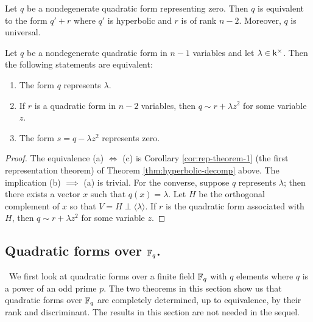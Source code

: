 \begin{theoremx}\label{thm:hyperbolic-decomp-2} Let \(q\) be a nondegenerate
    quadratic form representing zero. Then \(q\) is equivalent to the form \(q'
    + r\) where \(q'\) is hyperbolic and \(r\) is of rank \(n - 2\). Moreover,
    \(q\) is universal.
\end{theoremx}

\begin{corollary}
    Let \(q\) be a nondegenerate quadratic form in \(n - 1\) variables and let
    \(\lambda \in \mathsf{k}^{\times}\). Then the following statements are equivalent:

    \smallskip

    \begin{enumerate}[nosep, label=(\alph*)]
        \item The form \(q\) represents \(\lambda\).
        \item If \(r\) is a quadratic form in \(n - 2\) variables, then \(q \sim
        r + \lambda z^2\) for some variable \(z\).
        \item The form \(s = q - \lambda z^2\) represents zero.
    \end{enumerate}
\end{corollary}

\begin{proof}
    The equivalence (a) \(\iff\) (c) is Corollary \ref{cor:rep-theorem-1} (the
    first representation theorem) of Theorem \ref{thm:hyperbolic-decomp} above.
    The implication (b) \(\implies\) (a) is trivial. For the converse, suppose
    \(q\) represents \(\lambda\); then there exists a vector \(x\) such that
    \(q(x) = \lambda\). Let \(H\) be the orthogonal complement of \(x\) so that
    \(V = H \perp \langle \lambda \rangle.\) If \(r\) is the quadratic form
    associated with \(H\), then \(q \sim r + \lambda z^2\) for some variable
    \(z\).
\end{proof}

\subsection{Quadratic forms over \(\mathbb{F}_q\).}~We first look at quadratic
forms over a finite field \(\mathbb{F}_q\) with \(q\) elements where \(q\) is
a power of an odd prime \(p\). The two theorems in this section show us that
quadratic forms over \(\mathbb{F}_q\) are completely determined, up to
equivalence, by their rank and discriminant. The results in this section are not
needed in the sequel.\label{sec:quadratic-forms-fq}

